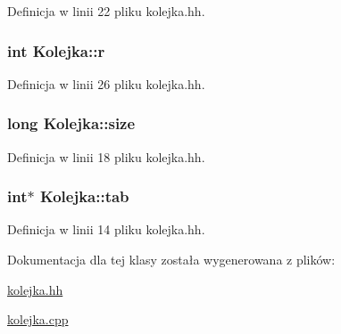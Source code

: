 Definicja w linii 22 pliku kolejka.\-hh.

\hypertarget{class_kolejka_ae16213a5b751800eb48da6bede435ad0}{
\subsubsection[{r}]{\setlength{\rightskip}{0pt plus 5cm}int Kolejka\-::r\hspace{0.3cm}{\ttfamily [private]}}}\label{class_kolejka_ae16213a5b751800eb48da6bede435ad0}


Definicja w linii 26 pliku kolejka.\-hh.

\hypertarget{class_kolejka_a84898848de8e77a76a6f2e4a7393b4bb}{
\subsubsection[{size}]{\setlength{\rightskip}{0pt plus 5cm}long Kolejka\-::size\hspace{0.3cm}{\ttfamily [private]}}}\label{class_kolejka_a84898848de8e77a76a6f2e4a7393b4bb}


Definicja w linii 18 pliku kolejka.\-hh.

\hypertarget{class_kolejka_a49e444e7bd7b91a78bc2a46426b73128}{
\subsubsection[{tab}]{\setlength{\rightskip}{0pt plus 5cm}int$\ast$ Kolejka\-::tab\hspace{0.3cm}{\ttfamily [private]}}}\label{class_kolejka_a49e444e7bd7b91a78bc2a46426b73128}


Definicja w linii 14 pliku kolejka.\-hh.



Dokumentacja dla tej klasy została wygenerowana z plików\-:\begin{DoxyCompactItemize}
\item 
\hyperlink{kolejka_8hh}{kolejka.\-hh}\item 
\hyperlink{kolejka_8cpp}{kolejka.\-cpp}\end{DoxyCompactItemize}
